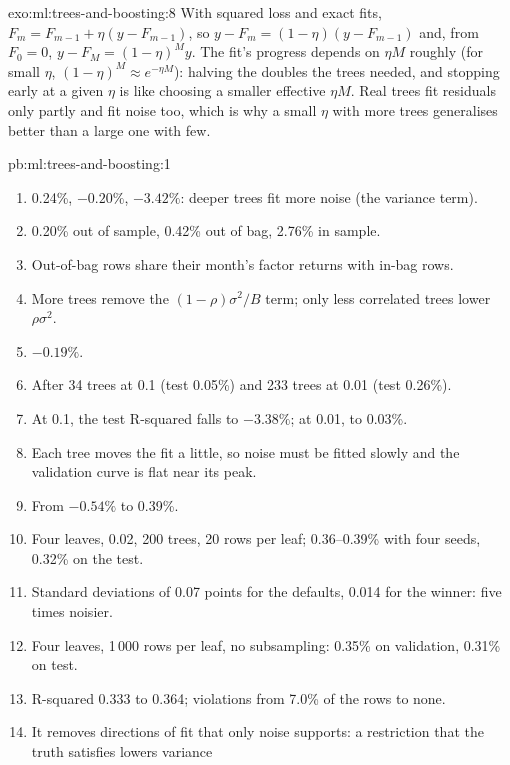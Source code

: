 \begin{solution}{exo:ml:trees-and-boosting:8}
With squared loss and exact fits, $F_m = F_{m-1} + \eta(y - F_{m-1})$, so $y - F_m = (1 - \eta)(y - F_{m-1})$ and, from
$F_0 = 0$, $y - F_M = (1 - \eta)^My$. The fit's progress depends on $\eta M$ roughly (for small $\eta$, $(1 - \eta)^M
\approx e^{-\eta M}$): halving the  doubles the trees needed, and stopping early at a given $\eta$ is like
choosing a smaller effective $\eta M$. Real trees fit residuals only partly and fit noise too, which is why a small
$\eta$ with more trees generalises better than a large one with few.
\end{solution}

\begin{solution}{pb:ml:trees-and-boosting:1}
\begin{enumerate}
\item 0.24\%, $-0.20\%$, $-3.42\%$: deeper trees fit more noise (the variance term).
\item 0.20\% out of sample, 0.42\% out of bag, 2.76\% in sample.
\item Out-of-bag rows share their month's factor returns with in-bag rows.
\item More trees remove the $(1-\rho)\sigma^2/B$ term; only less correlated trees lower $\rho\sigma^2$.
\item $-0.19\%$.
\item After 34 trees at 0.1 (test 0.05\%) and 233 trees at 0.01 (test 0.26\%).
\item At 0.1, the test R-squared falls to $-3.38\%$; at 0.01, to 0.03\%.
\item Each tree moves the fit a little, so noise must be fitted slowly and the validation curve is flat near its peak.
\item From $-0.54\%$ to 0.39\%.
\item Four leaves,  0.02, 200 trees, 20 rows per leaf; 0.36--0.39\% with four seeds, 0.32\% on the test.
\item Standard deviations of 0.07 points for the defaults, 0.014 for the winner: five times noisier.
\item Four leaves, 1\,000 rows per leaf, no subsampling: 0.35\% on validation, 0.31\% on test.
\item R-squared 0.333 to 0.364; violations from 7.0\% of the rows to none.
\item It removes directions of fit that only noise supports: a restriction that the truth satisfies lowers variance

\end{enumerate}
\end{solution}
